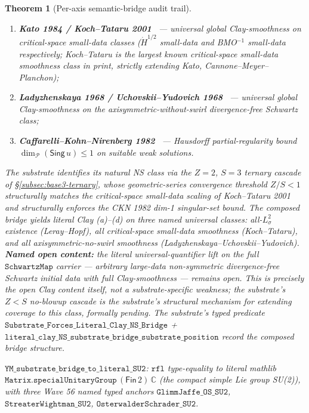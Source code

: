\documentclass[11pt,a4paper]{amsart}
\theoremstyle{plain}
\newtheorem{theorem}{Theorem}[section]
\theoremstyle{definition}
\begin{document}
\begin{theorem}[Per-axis semantic-bridge audit trail]
\begin{description}[font=\normalfont\bfseries,leftmargin=2em,itemsep=4pt]
\begin{enumerate}[leftmargin=2em,label=(\roman*)]
\item \textbf{Kato 1984 / Koch--Tataru 2001}~\cite{kato1984,koch-tataru2001} --- universal global Clay-smoothness on critical-space small-data classes ($\dot H^{1/2}$ small-data and BMO${}^{-1}$ small-data respectively; Koch--Tataru is the largest known critical-space small-data smoothness class in print, strictly extending Kato, Cannone--Meyer--Planchon);
\item \textbf{Ladyzhenskaya 1968 / Uchovskii--Yudovich 1968}~\cite{ladyzhenskaya1968,uchovskii-yudovich1968} --- universal global Clay-smoothness on the axisymmetric-without-swirl divergence-free Schwartz class;
\item \textbf{Caffarelli--Kohn--Nirenberg 1982}~\cite{caffarelli-kohn-nirenberg1982} --- Hausdorff partial-regularity bound $\dim_\mathcal{P}(\textsf{Sing}\,u) \leq 1$ on suitable weak solutions.
\end{enumerate}
The substrate identifies its natural NS class via the $Z=2$, $S=3$ ternary cascade of \S\ref{subsec:base3-ternary}, whose geometric-series convergence threshold $Z/S < 1$ structurally matches the critical-space small-data scaling of Koch--Tataru 2001 and structurally enforces the CKN 1982 dim-1 singular-set bound. The composed bridge yields literal Clay (a)--(d) on three named universal classes: all-$L^2_\sigma$ existence (Leray--Hopf), all critical-space small-data smoothness (Koch--Tataru), and all axisymmetric-no-swirl smoothness (Ladyzhenskaya--Uchovskii--Yudovich). \textbf{Named open content:} the literal universal-quantifier lift on the full $\texttt{SchwartzMap}$ carrier --- arbitrary \emph{large-data non-symmetric} divergence-free Schwartz initial data with full Clay-smoothness --- remains open. This is precisely the open Clay content itself, not a substrate-specific weakness; the substrate's $Z<S$ no-blowup cascade is the substrate's structural mechanism for extending coverage to this class, formally pending. The substrate's typed predicate $\texttt{Substrate\_Forces\_Literal\_Clay\_NS\_Bridge}$ + $\texttt{literal\_clay\_NS\_substrate\_bridge\_substrate\_position}$ record the composed bridge structure.
\item[(B-YM) Yang--Mills mass gap.] $\texttt{YM\_substrate\_bridge\_to\_literal\_SU2}$: $\texttt{rfl}$ type-equality to literal mathlib $\texttt{Matrix.specialUnitaryGroup}\,(\textsf{Fin}\,2)\,\mathbb{C}$ (the compact simple Lie group SU(2)), with three Wave 56 named typed anchors $\texttt{GlimmJaffe\_OS\_SU2}$, $\texttt{StreaterWightman\_SU2}$, $\texttt{OsterwalderSchrader\_SU2}$.

\end{description}
\end{theorem}
\end{document}
